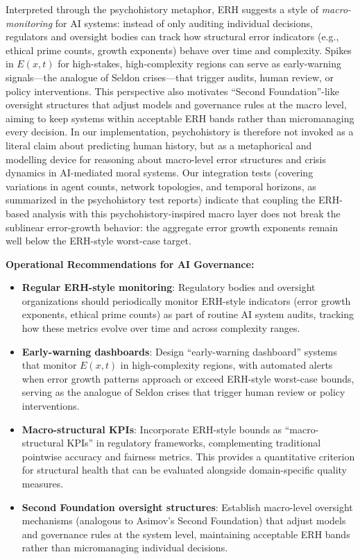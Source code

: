 \documentclass[12pt,a4paper]{article}
\theoremstyle{definition}
\theoremstyle{remark}
\begin{document}
Interpreted through the psychohistory metaphor, ERH suggests a style of \emph{macro-monitoring} for AI systems:
instead of only auditing individual decisions, regulators and oversight bodies can track how structural error indicators (e.g., ethical prime counts, growth exponents) behave over time and complexity.
Spikes in $E(x,t)$ for high-stakes, high-complexity regions can serve as early-warning signals---the analogue of Seldon crises---that trigger audits, human review, or policy interventions.
This perspective also motivates ``Second Foundation''-like oversight structures that adjust models and governance rules at the macro level, aiming to keep systems within acceptable ERH bands rather than micromanaging every decision.
In our implementation, psychohistory is therefore not invoked as a literal claim about predicting human history, but as a metaphorical and modelling device for reasoning about macro-level error structures and crisis dynamics in AI-mediated moral systems.
Our integration tests (covering variations in agent counts, network topologies, and temporal horizons, as summarized in the psychohistory test reports) indicate that coupling the ERH-based analysis with this psychohistory-inspired macro layer does not break the sublinear error-growth behavior: the aggregate error growth exponents remain well below the ERH-style worst-case target.

\textbf{Operational Recommendations for AI Governance:}
\begin{itemize}
    \item \textbf{Regular ERH-style monitoring}: Regulatory bodies and oversight organizations should periodically monitor ERH-style indicators (error growth exponents, ethical prime counts) as part of routine AI system audits, tracking how these metrics evolve over time and across complexity ranges.
    \item \textbf{Early-warning dashboards}: Design ``early-warning dashboard'' systems that monitor $E(x,t)$ in high-complexity regions, with automated alerts when error growth patterns approach or exceed ERH-style worst-case bounds, serving as the analogue of Seldon crises that trigger human review or policy interventions.
    \item \textbf{Macro-structural KPIs}: Incorporate ERH-style bounds as ``macro-structural KPIs'' in regulatory frameworks, complementing traditional pointwise accuracy and fairness metrics. This provides a quantitative criterion for structural health that can be evaluated alongside domain-specific quality measures.
    \item \textbf{Second Foundation oversight structures}: Establish macro-level oversight mechanisms (analogous to Asimov's Second Foundation) that adjust models and governance rules at the system level, maintaining acceptable ERH bands rather than micromanaging individual decisions.
\end{itemize}
\end{document}
